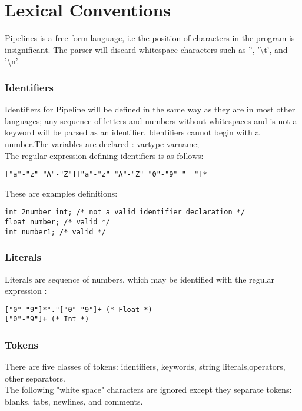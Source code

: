 \documentclass[./Report_main.tex]{subfiles}
\begin{document}
\section{Lexical Conventions}

Pipelines is a free form language, i.e the position of characters in the program is insignificant. The parser will discard whitespace characters such as '', '\textbackslash t', and '\textbackslash n'. 

\subsubsection{Identifiers}
Identifiers for Pipeline will be defined in the same way as they are in most other languages; any sequence of letters and numbers without whitespaces and is not a keyword will be parsed as an identifier. Identifiers cannot begin with a number.The variables are declared : vartype varname;  \\
The regular expression defining identifiers is as follows:  

\begin{lstlisting}
["a"-"z" "A"-"Z"]["a"-"z" "A"-"Z" "0"-"9" "_ "]*
\end{lstlisting}

These are examples definitions:

\begin{lstlisting}
int 2number int; /* not a valid identifier declaration */ 
float number; /* valid */ 
int number1; /* valid */
\end{lstlisting}

\subsubsection{Literals}
Literals are sequence of numbers, which may be identified with the regular expression : 
\begin{lstlisting}
["0"-"9"]*"."["0"-"9"]+ (* Float *)
["0"-"9"]+ (* Int *) 
\end{lstlisting}

\subsubsection{Tokens}
There are five classes of tokens:
identifiers, keywords, string literals,operators, other separators.\\
The following "white space" characters are ignored except they separate tokens: blanks, tabs, newlines, and comments.\\
\end{document}
